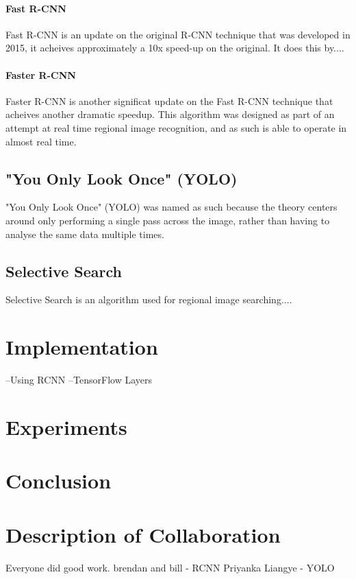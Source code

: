 \documentclass[10pt]{article}
\begin{document}
\paragraph{Fast R-CNN}
Fast R-CNN \cite{fast_rcnn} is an update on the original R-CNN technique that was developed in 2015, it acheives approximately a 10x speed-up on the original. It does this by....

\paragraph{Faster R-CNN}
Faster R-CNN \cite{faster_rcnn} is another significat update on the Fast R-CNN technique that acheives another dramatic speedup. This algorithm was designed as part of an attempt at real time regional image recognition, and as such is able to operate in almost real time.
	

\subsection{"You Only Look Once" (YOLO)}
"You Only Look Once" (YOLO) was named as such because the theory centers around only performing a single pass across the image, rather than having to analyse the same data multiple times.

\subsection{Selective Search}
Selective Search is an algorithm used for regional image searching....
	

\section{Implementation}
--Using RCNN
--TensorFlow Layers

\section{Experiments}

\section{Conclusion}

\section{Description of Collaboration}
Everyone did good work.
brendan and bill - RCNN
Priyanka Liangye - YOLO




\end{document}
